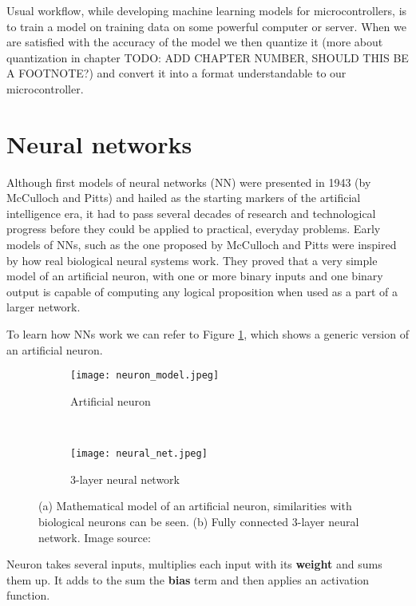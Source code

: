 Usual workflow, while developing machine learning models for microcontrollers, is to train a model on training data on some powerful computer or server. 
When we are satisfied with the accuracy of the model we then quantize it (more about quantization in chapter TODO: ADD CHAPTER NUMBER, SHOULD THIS BE A FOOTNOTE?) and convert it into a format understandable to our microcontroller.


\section{ Neural networks}\label{neural_networks_section}

Although first models of neural networks (NN) were presented in 1943 (by McCulloch and Pitts)\cite{geron} and hailed as the starting markers of the artificial intelligence era, it had to pass several decades of research and technological progress before they could be applied to practical, everyday problems.
Early models of NNs, such as the one proposed by McCulloch and Pitts were inspired by how real biological neural systems work. 
They proved that a very simple model of an artificial neuron, with one or more binary inputs and one binary output is capable of computing any logical proposition when used as a part of a larger network\cite{geron}.

To learn how NNs work we can refer to Figure \ref{neuron_model}, which shows a generic version of an artificial neuron.
\newline

\begin{figure}[ht] 
    \begin{subfigure}[b]{0.5\textwidth}
        \centering
        \texttt{[image: neuron\_model.jpeg]} 
        \caption{Artificial neuron}
        \label{neuron_model}
    \end{subfigure}
    \unskip\ \vrule\ 
    \begin{subfigure}[b]{0.5\textwidth}
        \centering
        \texttt{[image: neural\_net.jpeg]} 
        \caption{ 3-layer neural network}
        \label{neural_net}
    \end{subfigure}
    
    \caption{ (a) Mathematical model of an artificial neuron, similarities with biological neurons can be seen. (b) Fully connected 3-layer neural network. Image source: \cite{cs231n}}
    \label{neural}
\end{figure}

Neuron takes several inputs, multiplies each input with its \textbf{weight} and sums them up.
It adds to the sum the \textbf{bias} term and then applies an activation function.

